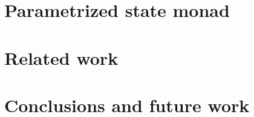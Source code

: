 \documentclass[a4paper]{article}
\begin{document}
\section{Parametrized state monad}
\label{sec:parametrized_state_monad}
 

\section{Related work}
\label{sec:related_work}
 

\section{Conclusions and future work}
\label{sec:conclusions}
 


 
\cite{*}
\nocite{}
\end{document}
